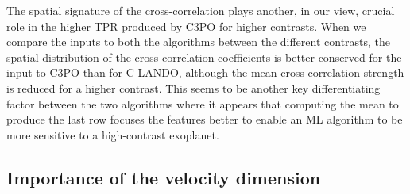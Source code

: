 \documentclass[referee]{aa} %
\begin{document}
The spatial signature of the cross-correlation plays another, in our view, crucial role in the higher TPR produced by C3PO for higher contrasts.
When we compare the inputs to both the algorithms between the different contrasts, the spatial distribution of the cross-correlation coefficients is better conserved for the input to C3PO than for C-LANDO, although the mean cross-correlation strength is reduced for a higher contrast.
This seems to be another key differentiating factor between the two algorithms where it appears that computing the mean to produce the last row focuses the features better to enable an ML algorithm to be more sensitive to a high-contrast exoplanet.
\subsection{Importance of the velocity dimension}
\end{document}
